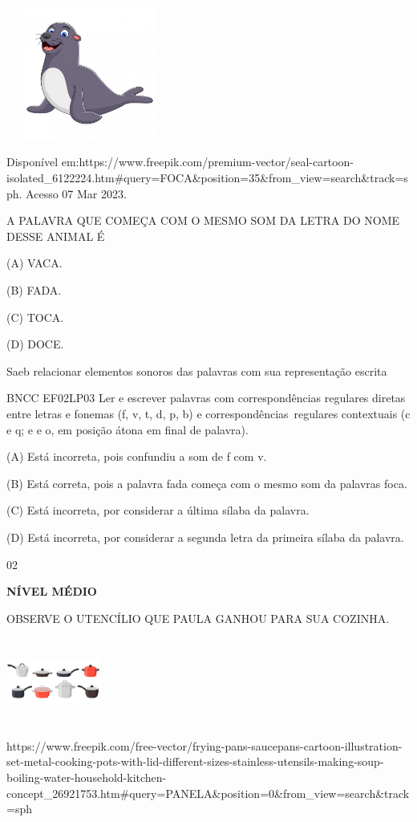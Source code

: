 {{\includegraphics[width=2.16528in,height=1.72778in]{media/image139.jpeg}

Disponível
em:https://www.freepik.com/premium-vector/seal-cartoon-isolated\_6122224.htm\#query=FOCA\&position=35\&from\_view=search\&track=sph.
Acesso 07 Mar 2023.

A PALAVRA QUE COMEÇA COM O MESMO SOM DA LETRA DO NOME DESSE ANIMAL É

(A) VACA.

(B) FADA.

(C) TOCA.

(D) DOCE.

Saeb relacionar elementos sonoros das palavras com sua representação
escrita

BNCC EF02LP03 Ler e escrever palavras com correspondências regulares
diretas entre letras e fonemas (f, v, t, d, p, b) e
correspondências~regulares contextuais (c e q; e e o, em posição átona
em final de palavra).

\protect\hypertarget{_Hlk129501253}{}{}(A) Está incorreta, pois
confundiu a som de f com v.

(B) Está correta, pois a palavra fada começa com o mesmo som da palavras
foca.

(C) Está incorreta, por considerar a última sílaba da palavra.

(D) Está incorreta, por considerar a segunda letra da primeira sílaba da
palavra.

\num{02}

\textbf{NÍVEL MÉDIO}

OBSERVE O UTENCÍLIO QUE PAULA GANHOU PARA SUA COZINHA.

\includegraphics[width=1.22222in,height=1.11389in]{media/image19.jpeg}

https://www.freepik.com/free-vector/frying-pans-saucepans-cartoon-illustration-set-metal-cooking-pots-with-lid-different-sizes-stainless-utensils-making-soup-boiling-water-household-kitchen-concept\_26921753.htm\#query=PANELA\&position=0\&from\_view=search\&track=sph

}}
